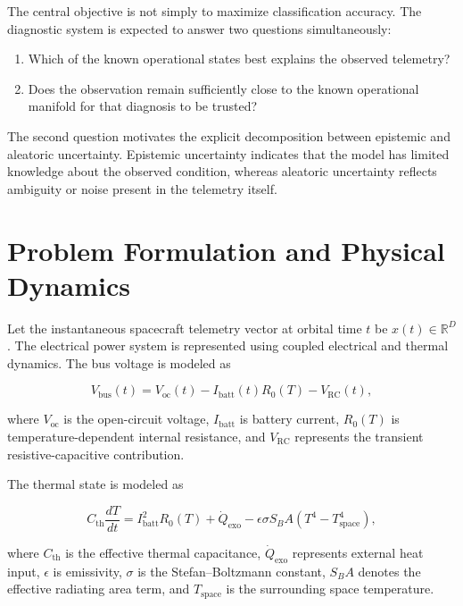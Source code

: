 \documentclass[conference]{IEEEtran}
\begin{document}
The central objective is not simply to maximize classification accuracy.
The diagnostic system is expected to answer two questions simultaneously:
\begin{enumerate}
    \item Which of the known operational states best explains the observed
    telemetry?
    \item Does the observation remain sufficiently close to the known
    operational manifold for that diagnosis to be trusted?
\end{enumerate}

The second question motivates the explicit decomposition between epistemic
and aleatoric uncertainty. Epistemic uncertainty indicates that the model has
limited knowledge about the observed condition, whereas aleatoric uncertainty
reflects ambiguity or noise present in the telemetry itself.

\section{Problem Formulation and Physical Dynamics}

Let the instantaneous spacecraft telemetry vector at orbital time $t$ be
$x(t)\in\mathbb{R}^{D}$. The electrical power system is represented using
coupled electrical and thermal dynamics. The bus voltage is modeled as

\begin{equation}
V_{\mathrm{bus}}(t)
=
V_{\mathrm{oc}}(t)
-
I_{\mathrm{batt}}(t)R_0(T)
-
V_{\mathrm{RC}}(t),
\label{eq:vbus}
\end{equation}

where $V_{\mathrm{oc}}$ is the open-circuit voltage,
$I_{\mathrm{batt}}$ is battery current, $R_0(T)$ is temperature-dependent
internal resistance, and $V_{\mathrm{RC}}$ represents the transient
resistive-capacitive contribution.

The thermal state is modeled as

\begin{equation}
C_{\mathrm{th}}\frac{dT}{dt}
=
I_{\mathrm{batt}}^2R_0(T)
+
\dot{Q}_{\mathrm{exo}}
-
\epsilon\sigma S_B A
\left(T^4-T_{\mathrm{space}}^4\right),
\label{eq:thermal}
\end{equation}

where $C_{\mathrm{th}}$ is the effective thermal capacitance,
$\dot{Q}_{\mathrm{exo}}$ represents external heat input,
$\epsilon$ is emissivity, $\sigma$ is the Stefan--Boltzmann constant,
$S_BA$ denotes the effective radiating area term, and $T_{\mathrm{space}}$
is the surrounding space temperature.
\end{document}
